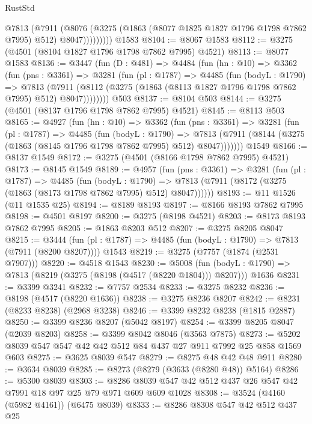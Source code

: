 \begin{lexlean}{RustStd}
\begin{coremodule}
              @7813
                (@7911
                  (@8076
                    (@3275 (@1863 (@8077 @1825 @1827 @1796 @1798 @7862 @7995) @512) @8047)))))))))
    @1583
@8104 := @8067 @1583
@8112 := @3275 (@4501 (@8104 @1827 @1796 @1798 @7862 @7995) @4521)
@8113 := @8077 @1583
@8136 := @3447
    (fun (D : @481) =>
    @4484
      (fun (hn : @10) =>
      @3362
        (fun (pns : @3361) =>
        @3281
          (fun (pl : @1787) =>
          @4485
            (fun (bodyL : @1790) =>
            @7813
              (@7911 (@8112 (@3275 (@1863 (@8113 @1827 @1796 @1798 @7862 @7995) @512) @8047))))))))
    @503
@8137 := @8104 @503
@8144 := @3275 (@4501 (@8137 @1796 @1798 @7862 @7995) @4521)
@8145 := @8113 @503
@8165 := @4927
    (fun (hn : @10) =>
    @3362
      (fun (pns : @3361) =>
      @3281
        (fun (pl : @1787) =>
        @4485
          (fun (bodyL : @1790) =>
          @7813 (@7911 (@8144 (@3275 (@1863 (@8145 @1796 @1798 @7862 @7995) @512) @8047)))))))
    @1549
@8166 := @8137 @1549
@8172 := @3275 (@4501 (@8166 @1798 @7862 @7995) @4521)
@8173 := @8145 @1549
@8189 := @4957
    (fun (pns : @3361) =>
    @3281
      (fun (pl : @1787) =>
      @4485
        (fun (bodyL : @1790) =>
        @7813 (@7911 (@8172 (@3275 (@1863 (@8173 @1798 @7862 @7995) @512) @8047))))))
@8193 := @11 @1526 (@11 @1535 @25)
@8194 := @8189 @8193
@8197 := @8166 @8193 @7862 @7995
@8198 := @4501 @8197
@8200 := @3275 (@8198 @4521)
@8203 := @8173 @8193 @7862 @7995
@8205 := @1863 @8203 @512
@8207 := @3275 @8205 @8047
@8215 := @3444
    (fun (pl : @1787) => @4485 (fun (bodyL : @1790) => @7813 (@7911 (@8200 @8207))))
    @1543
@8219 := @3275 (@7757 (@1874 (@2531 @7907)))
@8220 := @4518 @1543
@8230 := @5008
    (fun (bodyL : @1790) => @7813 (@8219 (@3275 (@8198 (@4517 (@8220 @1804))) @8207)))
    @1636
@8231 := @3399 @3241
@8232 := @7757 @2534
@8233 := @3275 @8232
@8236 := @8198 (@4517 (@8220 @1636))
@8238 := @3275 @8236 @8207
@8242 := @8231 (@8233 @8238) (@2968 @3238)
@8246 := @3399 @8232 @8238 (@1815 @2887)
@8250 := @3399 @8236 @8207 (@5042 @8197)
@8254 := @3399 @8205 @8047 (@2039 @8203)
@8258 := @3399 @8042 @8046 (@3563 @7875)
@8273 := @5202 @8039 @547 @547 @42 @42 @512 @84 @437 @27 @911 @7992 @25 @858 @1569 @603
@8275 := @3625 @8039 @547
@8279 := @8275 @48 @42 @48 @911
@8280 := @3634 @8039
@8285 := @8273 (@8279 (@3633 (@8280 @48)) @5164)
@8286 := @5300 @8039
@8303 := @8286 @8039 @547 @42 @512 @437 @26 @547 @42 @7991 @18 @97 @25 @79 @971 @609 @609 @1028
@8308 := @3524 (@4160 (@5982 @4161)) (@6475 @8039)
@8333 := @8286
    @8308
    @547
    @42
    @512
    @437
    @25

\end{coremodule}
\end{lexlean}
